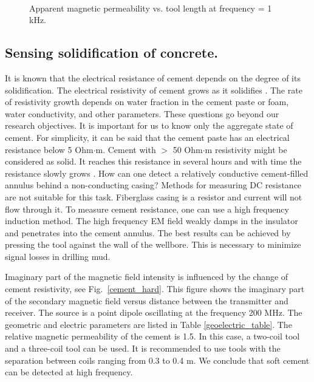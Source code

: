 \documentclass[10pt,twoside]{article}
\begin{document}
\begin{figure}[ht!]
\caption{ Apparent magnetic permeability vs. tool length at frequency = 1 kHz. }
\label{mu_apparent}\

\end{figure}

\subsection{Sensing solidification of concrete.}
It is known that the electrical resistance of cement depends on the degree of its solidification. The electrical resistivity of cement grows as it solidifies  \citep{Sallehi2015}. The rate of resistivity growth depends on water fraction in the cement paste or foam, water conductivity, and other parameters. These questions go beyond our research objectives. It is important for us to know only the aggregate state of cement.  For simplicity, it can be said that the cement paste has an electrical resistance below 5 Ohm$\cdot$m. Cement with $>$ 50 Ohm$\cdot$m resistivity might be considered as solid. It reaches this resistance in several hours and with time the resistance slowly grows \citep{Osterminski2012}. How can one detect a relatively conductive cement-filled annulus behind a non-conducting casing? Methods for measuring DC resistance are not suitable for this task. Fiberglass casing is a resistor and current will not flow through it. To measure cement resistance, one can use a high frequency induction method. The high frequency EM field weakly damps in the insulator and penetrates into the cement annulus. The best results can be achieved by pressing the tool against the wall of the wellbore. This is necessary to minimize signal losses in drilling mud.

Imaginary part of the magnetic field intensity is influenced by the change of cement resistivity, see Fig.~\ref{cement_hard}. This figure shows the imaginary part of the secondary magnetic field versus distance between the transmitter and receiver. The source is a point dipole oscillating at the frequency 200 MHz. The geometric and electric parameters are listed in Table \ref{geoelectric_table}. The relative magnetic permeability of the cement is 1.5. In this case, a two-coil tool and a three-coil tool can be used. It is recommended to use tools with the separation between coils ranging from 0.3 to 0.4 m. We conclude that soft cement can be detected at high frequency.
\end{document}
